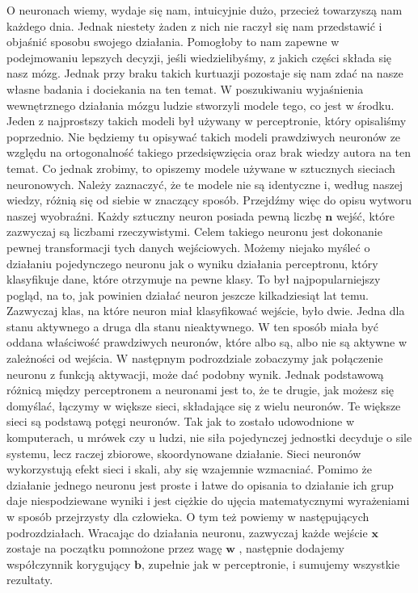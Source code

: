 O neuronach wiemy, wydaje się nam, intuicyjnie dużo, przecież towarzyszą nam każdego dnia. Jednak niestety żaden z nich nie raczył się nam przedstawić i objaśnić sposobu swojego działania. Pomogłoby to nam zapewne w podejmowaniu lepszych decyzji, jeśli wiedzielibyśmy, z jakich części składa się nasz mózg. Jednak przy braku takich kurtuazji pozostaje się nam zdać na nasze własne badania i dociekania na ten temat. W poszukiwaniu wyjaśnienia wewnętrznego działania mózgu ludzie stworzyli modele tego, co jest w środku. Jeden z najprostszy takich modeli był używany w perceptronie, który opisaliśmy poprzednio. Nie będziemy tu opisywać takich modeli prawdziwych neuronów ze względu na ortogonalność takiego przedsięwzięcia oraz brak wiedzy autora na ten temat. Co jednak zrobimy, to opiszemy modele używane w sztucznych sieciach neuronowych. Należy zaznaczyć, że te modele nie są identyczne i, według naszej wiedzy, różnią się od siebie w znaczący sposób. Przejdźmy więc do opisu wytworu naszej wyobraźni. Każdy sztuczny neuron posiada pewną liczbę $\boldsymbol{n}$  wejść, które zazwyczaj są liczbami rzeczywistymi. Celem takiego neuronu jest dokonanie pewnej transformacji tych danych wejściowych. Możemy niejako myśleć o działaniu pojedynczego neuronu jak o wyniku działania perceptronu, który klasyfikuje dane, które otrzymuje na pewne klasy. To był najpopularniejszy pogląd, na to, jak powinien działać neuron jeszcze kilkadziesiąt lat temu. Zazwyczaj klas, na które neuron miał klasyfikować wejście, było dwie. Jedna dla stanu aktywnego a druga dla stanu nieaktywnego. W ten sposób miała być oddana właściwość prawdziwych neuronów, które albo są, albo nie są aktywne w zależności od wejścia. W następnym podrozdziale zobaczymy jak połączenie neuronu z funkcją aktywacji, może dać podobny wynik. Jednak podstawową różnicą między perceptronem a neuronami jest to, że te drugie, jak możesz się domyślać, łączymy w większe sieci, składające się z wielu neuronów. Te większe sieci są podstawą potęgi neuronów. Tak jak to zostało udowodnione w komputerach, u mrówek czy u ludzi, nie siła pojedynczej jednostki decyduje o sile systemu, lecz raczej zbiorowe, skoordynowane działanie. Sieci neuronów wykorzystują efekt sieci i skali, aby się wzajemnie wzmacniać. Pomimo że działanie jednego neuronu jest proste i łatwe do opisania to działanie ich grup daje niespodziewane wyniki i jest ciężkie do ujęcia matematycznymi wyrażeniami w sposób przejrzysty dla człowieka. O tym też powiemy w następujących podrozdziałach. Wracając do działania neuronu, zazwyczaj każde wejście $\boldsymbol{x}$  zostaje na początku pomnożone przez wagę $\boldsymbol{w}$ , następnie dodajemy współczynnik korygujący $\boldsymbol{b}$, zupełnie jak w perceptronie, i sumujemy wszystkie rezultaty.\newline

